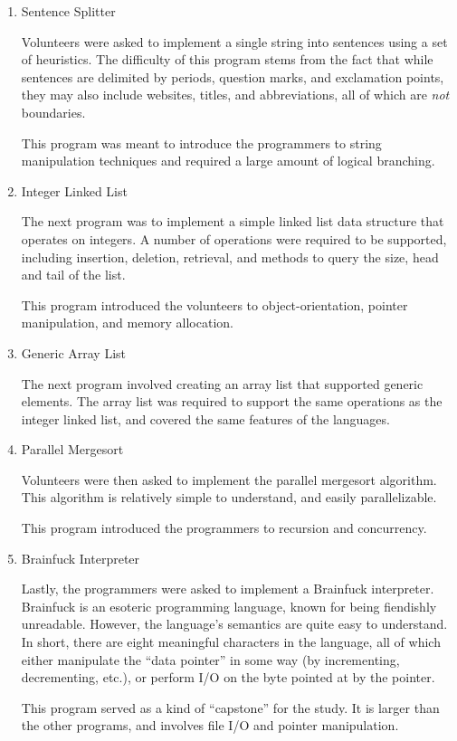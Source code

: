 \documentclass[finalcopy]{srpaper}
\begin{document}
\begin{enumerate}

\item Sentence Splitter

Volunteers were asked to implement a single string into sentences using a set
of heuristics. The difficulty of this program stems from the fact that
while sentences are delimited by periods, question marks, and exclamation
points, they may also include websites, titles, and abbreviations, all of
which are \textit{not} boundaries.

This program was meant to introduce the programmers to string manipulation
techniques and required a large amount of logical branching.

\item Integer Linked List

The next program was to implement a simple linked list data structure that
operates on integers. A number of operations were required to be supported,
including insertion, deletion, retrieval, and methods to query the size, head
and tail of the list.

This program introduced the volunteers to object-orientation, pointer
manipulation, and memory allocation.

\item Generic Array List

The next program involved creating an array list that supported generic
elements. The array list was required to support the same operations as the
integer linked list, and covered the same features of the languages.

\item Parallel Mergesort

Volunteers were then asked to implement the parallel mergesort algorithm. This
algorithm is relatively simple to understand, and easily parallelizable.

This program introduced the programmers to recursion and concurrency.

\item Brainfuck Interpreter

Lastly, the programmers were asked to implement a Brainfuck interpreter.
Brainfuck is an esoteric programming language, known for being fiendishly
unreadable. However, the language's semantics are quite easy to understand. In
short, there are eight meaningful characters in the language, all of which
either manipulate the ``data pointer'' in some way (by incrementing,
decrementing, etc.), or perform I/O on the byte pointed at by the pointer.

This program served as a kind of ``capstone'' for the study. It is larger than
the other programs, and involves file I/O and pointer manipulation.

\end{enumerate}
\end{document}
